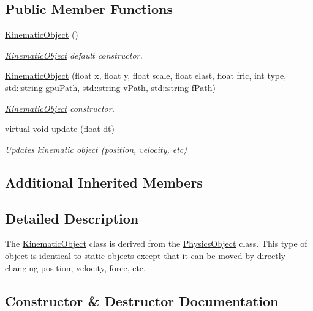 \subsection*{Public Member Functions}
\begin{DoxyCompactItemize}
\item 
\hyperlink{class_kinematic_object_a633cbc2ebe42be4d0a5fd8ddf99a1b72}{Kinematic\+Object} ()\hypertarget{class_kinematic_object_a633cbc2ebe42be4d0a5fd8ddf99a1b72}{}\label{class_kinematic_object_a633cbc2ebe42be4d0a5fd8ddf99a1b72}

\begin{DoxyCompactList}\small\item\em \hyperlink{class_kinematic_object}{Kinematic\+Object} default constructor. \end{DoxyCompactList}\item 
\hyperlink{class_kinematic_object_a28d858a369fffd904d9dd031b2c70197}{Kinematic\+Object} (float x, float y, float scale, float elast, float fric, int type, std\+::string gpu\+Path, std\+::string v\+Path, std\+::string f\+Path)
\begin{DoxyCompactList}\small\item\em \hyperlink{class_kinematic_object}{Kinematic\+Object} constructor. \end{DoxyCompactList}\item 
virtual void \hyperlink{class_kinematic_object_a41b3cb111b8862cdeaace5857b62bfdd}{update} (float dt)
\begin{DoxyCompactList}\small\item\em Updates kinematic object (position, velocity, etc) \end{DoxyCompactList}\end{DoxyCompactItemize}
\subsection*{Additional Inherited Members}


\subsection{Detailed Description}
The \hyperlink{class_kinematic_object}{Kinematic\+Object} class is derived from the \hyperlink{class_physics_object}{Physics\+Object} class. This type of object is identical to static objects except that it can be moved by directly changing position, velocity, force, etc. 

\subsection{Constructor \& Destructor Documentation}
